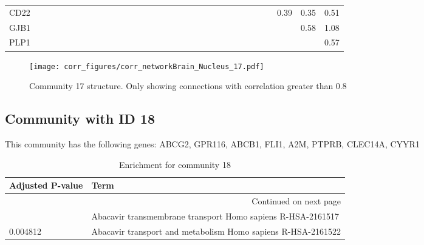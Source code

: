 \begin{longtable}{lrrrrrrrrrrrrrrrrrrrrrrrrrrrrrrr}
CD22    &             &             &             &          &              &              &            &            &               &              &           &             &             &             &              &             &               &              &             &               &            &            &            &             &           &            &           &            &       0.39 &       0.35 &       0.51 \\
GJB1    &             &             &             &          &              &              &            &            &               &              &           &             &             &             &              &             &               &              &             &               &            &            &            &             &           &            &           &            &            &       0.58 &       1.08 \\
PLP1    &             &             &             &          &              &              &            &            &               &              &           &             &             &             &              &             &               &              &             &               &            &            &            &             &           &            &           &            &            &            &       0.57 \\
\end{longtable}


\begin{figure}[h!]
\centering
\texttt{[image: corr\_figures/corr\_networkBrain\_Nucleus\_17.pdf]}
\caption{Community 17 structure. Only showing connections with correlation greater than 0.8}
\end{figure}




\subsection*{Community with ID 18}
This community has the following genes: ABCG2, GPR116, ABCB1, FLI1, A2M, PTPRB, CLEC14A, CYYR1
\\
\begin{longtable}{p{2.4cm}p{14.5cm}}
\caption{Enrichment for community 18}\\
\toprule
Adjusted \newline P-value &                                                          Term \\
\midrule
\endhead
\midrule
\multicolumn{2}{r}{{Continued on next page}} \\
\midrule
\endfoot

\bottomrule
\endlastfoot
                 0.002141 &   Abacavir transmembrane transport Homo sapiens R-HSA-2161517 \\
                 0.004812 &  Abacavir transport and metabolism Homo sapiens R-HSA-2161522 \\
\end{longtable}


